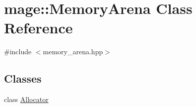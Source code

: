 \hypertarget{classmage_1_1_memory_arena}{}\section{mage\+:\+:Memory\+Arena Class Reference}
\label{classmage_1_1_memory_arena}


{\ttfamily \#include $<$memory\+\_\+arena.\+hpp$>$}

\subsection*{Classes}
\begin{DoxyCompactItemize}
\item 
class \hyperlink{classmage_1_1_memory_arena_1_1_allocator}{Allocator}
\end{DoxyCompactItemize}
